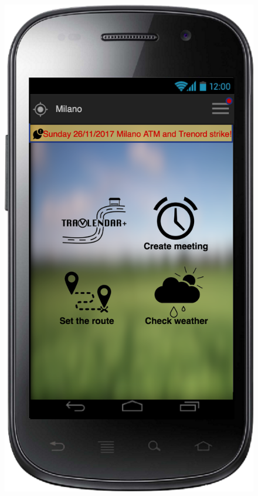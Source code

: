 \documentclass[a4paper,leqno]{article}
\begin{document}
\begin{figure}
\begin{minipage}[!h]{0.45\linewidth}
\end{minipage}
\hspace{0.5cm}
\begin{minipage}[!h]{0.45\linewidth}
	\centering
	\includegraphics[scale = 0.15]{mainPage.png}
\end{minipage}


\end{figure}
\end{document}

